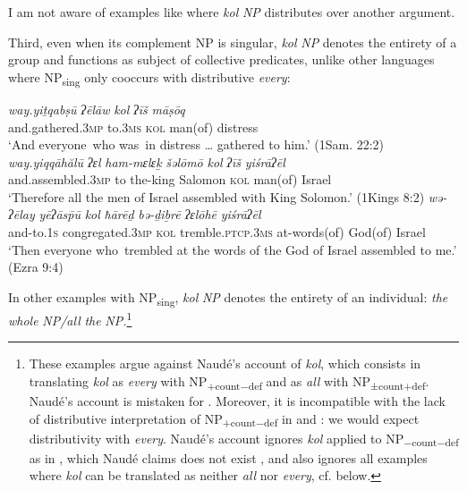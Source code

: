 \documentclass[output=paper]{langsci/langscibook}
\begin{document}
I am not aware of examples like  where \textit{kol} \textit{NP} distributes over another argument.

Third, even when its complement NP is singular, \textit{kol} \textit{NP} denotes the entirety of a group and functions as subject of collective predicates, unlike other languages where NP\textsubscript{sing} only cooccurs with distributive \textit{every}:\largerpage

\ea%
    \label{ex:doron:16}
    \ea
    \gll \textit{way.yiṯqabṣū}         \textit{ʔēlāw}    \textit{kol}   \textit{ʔīš}           \textit{māṣōq}\\
         and.gathered.3\textsc{mp}  to.\textsc{3ms}  \textsc{kol} man(of) distress \\
    \glt `And everyone~who was~in distress … gathered to him.' (1Sam. 22:2)
    \ex
    \gll \textit{way.yiqqāhălū}          \textit{ʔɛl} \textit{ham-mɛlɛḵ}  \textit{šəlōmō}    \textit{kol}   \textit{ʔīš}          \textit{yiśrāʔēl}\\
         and.assembled.3\textsc{mp}  to  the-king      Salomon \textsc{kol} man(of) Israel\\
    \glt `Therefore all the men of Israel assembled with King Solomon.' (1Kings 8:2)
    \ex
    \gll \textit{wə-ʔēlay}   \textit{yēʔās\={p}ū}  \textit{kol}   \textit{ħārēḏ} \textit{bə-ḏiḇrē}       \textit{ʔɛlōhē}      \textit{yiśrāʔēl}\\
         and-to.\textsc{1s}  congregated.3\textsc{mp}  \textsc{kol} tremble.\textsc{ptcp.3ms}  at-words(of)  God(of)  Israel\\
    \glt `Then everyone who~trembled at the words of the God of Israel assembled to me.' (Ezra 9:4)
    \z
\z


In other examples with NP\textsubscript{sing}, \textit{kol} \textit{NP} denotes the entirety of an individual: \textit{the} \textit{whole} \textit{NP/all} \textit{the} \textit{NP.}\footnote{These examples argue against Naudé’s \citeyearpar{Naudé2011interpretation} account of \textit{kol}, which consists in translating \textit{kol} as \textit{every} with NP\textsubscript{+count$-$def} and as \textit{all} with NP\textsubscript{±count+def}. Naudé’s account is mistaken for . Moreover, it is incompatible with the lack of distributive interpretation of NP\textsubscript{+count$-$def} in  and : we would expect distributivity with \textit{every}. Naudé’s account ignores \textit{kol} applied to NP\textsubscript{$-$count$-$def} as in , which Naudé claims does not exist \citeyearpar[418]{Naudé2011interpretation}, and also ignores all examples where \textit{kol} can be translated as neither \textit{all} nor \textit{every}, cf.  below.}
\end{document}
